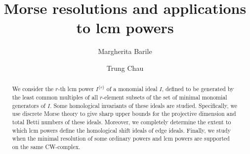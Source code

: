 \documentclass[reqno]{amsart}
\theoremstyle{definition}
\theoremstyle{remark}
\numberwithin{equation}{section}
\begin{document}
\title{Morse resolutions and applications to lcm powers}

\author{Margherita Barile}
\address{Dipartimento di Matematica, Università degli Studi di Bari Aldo Moro, Bari, Italy
}

\author{Trung Chau}
\address{Department of Mathematics, University of Manitoba, 420 Machray Hall, 186 Dysart
Road, Winnipeg, MB R3T 2N2 Canada}



\keywords{}

\subjclass[2020]{}


\begin{abstract}
    We consider the $r$-th lcm power $I^{\{r\}}$ of a monomial ideal $I$, defined to be generated by the least common multiples of all $r$-element subsets of the set of minimal monomial generators of $I$. Some homological invariants of these ideals are studied. Specifically, we use discrete Morse theory to give  sharp upper bounds for the projective dimension and total Betti numbers of these ideals. Moreover, we completely determine the extent to which lcm powers define the homological shift ideals of edge ideals. Finally, we study when the minimal resolution of some ordinary powers and lcm powers are supported on the same CW-complex. 
\end{abstract}
\maketitle



\end{document}
